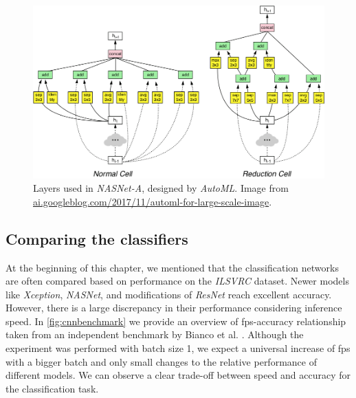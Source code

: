 \begin{figure}
    \includegraphics[width=\textwidth]{img/nasnet}
    \caption{Layers used in \textit{NASNet-A}, designed by \textit{AutoML}. Image from \url{ai.googleblog.com/2017/11/automl-for-large-scale-image}.}
    \label{fig:nasnet}
\end{figure}

\subsection{Comparing the classifiers}
At the beginning of this chapter, we mentioned that the classification networks are often compared based on performance on the \textit{ILSVRC} dataset. Newer models like \textit{Xception}, \textit{NASNet}, and modifications of \textit{ResNet} reach excellent accuracy. However, there is a large discrepancy in their performance considering inference speed. In \cref{fig:cnnbenchmark} we provide an overview of fps-accuracy relationship taken from an independent benchmark by Bianco et al. \cite{bib:cnnbenchmark}. Although the experiment was performed with batch size 1, we expect a universal increase of fps with a bigger batch and only small changes to the relative performance of different models. We can observe a clear trade-off between speed and accuracy for the classification task.

